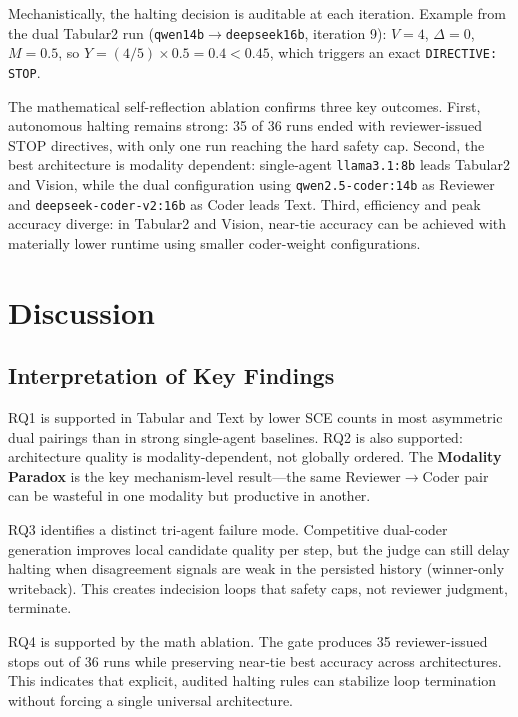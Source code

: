 \documentclass[11pt,a4paper]{article}
\begin{document}
Mechanistically, the halting decision is auditable at each iteration. Example from the dual Tabular2 run (\texttt{qwen14b$\rightarrow$deepseek16b}, iteration 9): $V=4$, $\Delta=0$, $M=0.5$, so $Y=(4/5)\times0.5=0.4<0.45$, which triggers an exact \texttt{DIRECTIVE: STOP}.

The mathematical self-reflection ablation confirms three key outcomes. First, autonomous halting remains strong: 35 of 36 runs ended with reviewer-issued STOP directives, with only one run reaching the hard safety cap. Second, the best architecture is modality dependent: single-agent \texttt{llama3.1:8b} leads Tabular2 and Vision, while the dual configuration using \texttt{qwen2.5-\allowbreak coder:14b} as Reviewer and \texttt{deepseek-\allowbreak coder-\allowbreak v2:16b} as Coder leads Text. Third, efficiency and peak accuracy diverge: in Tabular2 and Vision, near-tie accuracy can be achieved with materially lower runtime using smaller coder-weight configurations.

\section{Discussion}

\subsection{Interpretation of Key Findings}

RQ1 is supported in Tabular and Text by lower SCE counts in most asymmetric dual pairings than in strong single-agent baselines. RQ2 is also supported: architecture quality is modality-dependent, not globally ordered. The \textbf{Modality Paradox} is the key mechanism-level result---the same Reviewer$\rightarrow$Coder pair can be wasteful in one modality but productive in another.

RQ3 identifies a distinct tri-agent failure mode. Competitive dual-coder generation improves local candidate quality per step, but the judge can still delay halting when disagreement signals are weak in the persisted history (winner-only writeback). This creates indecision loops that safety caps, not reviewer judgment, terminate.

RQ4 is supported by the math ablation. The gate produces 35 reviewer-issued stops out of 36 runs while preserving near-tie best accuracy across architectures. This indicates that explicit, audited halting rules can stabilize loop termination without forcing a single universal architecture.
\end{document}
